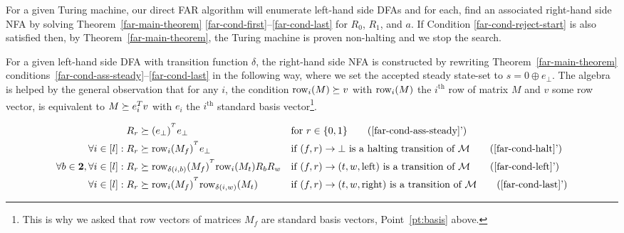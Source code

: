 For a given Turing machine, our direct FAR algorithm will enumerate left-hand side DFAs and for each, find an associated right-hand side NFA by solving Theorem~\ref{far-main-theorem} \eqref{far-cond-first}--\eqref{far-cond-last} for $R_0$, $R_1$, and $a$. If Condition \eqref{far-cond-reject-start} is also satisfied then, by Theorem~\ref{far-main-theorem}, the Turing machine is proven non-halting and we stop the search.


For a given left-hand side DFA with transition function $\delta$, the right-hand side NFA is constructed by rewriting Theorem~\ref{far-main-theorem} conditions~\eqref{far-cond-ass-steady}--\eqref{far-cond-last} in the following way, where we set the accepted steady state-set to $s=0\oplus e_\bot$. The algebra is helped by the general observation that for any $i$, the condition $\text{row}_i(M) \succeq v$ with $\text{row}_i(M)$ the $i^\text{th}$ row of matrix $M$ and $v$ some row vector, is equivalent to $M\succeq e_i^T v$ with $e_i$ the $i^\text{th}$ standard basis vector\footnote{This is why we asked that row vectors of matrices $M_f$ are standard basis vectors, Point~\ref{pt:basis} above.}.



\begin{align}
  R_r                                            & \succeq (e_\bot)^{\T}e_\bot
                                                 &                                                  & \text{for }r\in\{0,1\}
  \tag{\ref{far-cond-ass-steady}'}
  \\
  \forall i\in[l]: R_r                           & \succeq \row_i(M_f)^{\T}e_\bot
                                                 &                                                  & \text{if $(f,r) \to \bot$ is a halting transition of $\mathcal{M}$}
  \tag{\ref{far-cond-halt}'}
  \\
  \forall b \in \mathbf{2}, \forall i\in[l]: R_r & \succeq
  \row_{\delta(i,b)}(M_f)^{\T} \row_i(M_t)R_b R_w
                                                 &                                                  & \text{if $(f,r) \to (t,w,\text{left})$ is a transition of $\mathcal{M}$}
  \tag{\ref{far-cond-left}'}
  \\
  \forall i\in[l]: R_r                           & \succeq \row_i(M_f)^{\T} \row_{\delta(i,w)}(M_t)
                                                 &                                                  & \text{if $(f,r) \to (t,w,\text{right})$ is a transition of $\mathcal{M}$}
  \tag{\ref{far-cond-last}'}
\end{align}

